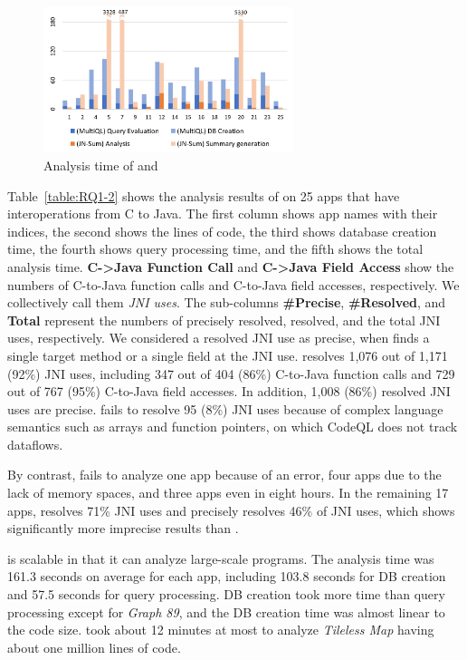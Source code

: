 \begin{figure}
  \centering
  \vspace{2mm}
  \includegraphics[width=0.65\textwidth]{img/graph}
  \vspace*{-.5em}
  \caption{Analysis time of \ours and \lees}
  \label{fig:graph}
\vspace*{-1em}
\end{figure}

Table~\ref{table:RQ1-2} shows the analysis results of \ours on 25 apps that have
interoperations from C to Java.
The first column shows app names with their indices, the second shows the lines of code,
the third shows database creation time, the
fourth shows query processing time, and the fifth shows the total analysis time.
{\bf C->Java Function Call} and {\bf C->Java Field Access} show the numbers of
C-to-Java function calls and C-to-Java field accesses, respectively. We
collectively call them \emph{JNI uses}.
The sub-columns {\bf \#Precise}, {\bf \#Resolved}, and {\bf Total} represent
the numbers of precisely resolved, resolved, and the total JNI uses,
respectively.
We considered a resolved JNI use as precise, when \ours finds a single target
method or a single field at the JNI use.
\ours resolves 1,076 out of 1,171 (92\%) JNI uses, including 347 out of 404
(86\%) C-to-Java function calls and 729 out of 767 (95\%) C-to-Java field
accesses. 
In addition, 1,008 (86\%) resolved JNI uses are precise.
\ours fails to resolve 95 (8\%) JNI uses because of complex language semantics
such as arrays and function pointers, on which
CodeQL does not track dataflows.

By contrast,
\lees fails to analyze one app because of an error, four apps due to the lack
of memory spaces, and three apps even in eight hours.  
In the remaining 17 apps, \lees resolves 71\% JNI uses
and precisely resolves 46\% of JNI uses,
which shows significantly more imprecise results than \ours.

\ours is scalable in that it can analyze large-scale programs. 
The analysis time was 161.3 seconds on average for each app, including 103.8
seconds for DB creation and 57.5 seconds for query processing.  
DB creation took more time than query processing except for {\it Graph 89}, and
the DB creation time was almost linear to the code size. 
\ours took about 12 minutes at most to analyze {\it Tileless Map} having about
one million lines of code.

